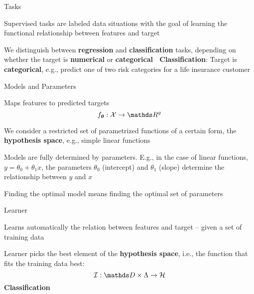 \documentclass[11pt,compress,t,notes=noshow, xcolor=table]{beamer}
\begin{document}
\begin{framei}{Tasks}
\item Supervised tasks are labeled data situations with the goal of learning the functional relationship between features and target
\item We distinguish between \textbf{regression} and \textbf{classification} tasks, depending on whether the target is \textbf{numerical} or \textbf{categorical}
\vfill
{}
{
$\;$
}
{
\footnotesize \textbf{Classification}: Target is \textbf{categorical}, e.g., predict one of two risk categories for a life insurance customer
}
\end{framei}


\begin{framei}[fs=small]{Models and Parameters}
\item Maps features to predicted targets
$$
f_{\thetav} : \Xspace \rightarrow \R^g
$$ 
\item  We consider a restricted set of parametrized functions of a certain form, the \textbf{hypothesis space}, e.g., simple linear functions
\item Models are fully determined by parameters. E.g., in the case of linear functions, $y = \theta_0 + \theta_1 x $, the parameters $\theta_0$ (intercept) and $\theta_1$ (slope) determine the relationship between $y$ and $x$
\item Finding the optimal model means finding the optimal set of parameters
\end{framei}


\begin{framei}{Learner}
\item Learns automatically the relation between features and target -- given a set of training data
\item Learner picks the best element of the \textbf{hypothesis space}, i.e., the function that fits the training data best:
$$
\ind: \preimageInducerShort \rightarrow \Hspace
$$
\vfill
{}
{
\center\textbf{Classification}
}
\end{framei}
\end{document}
